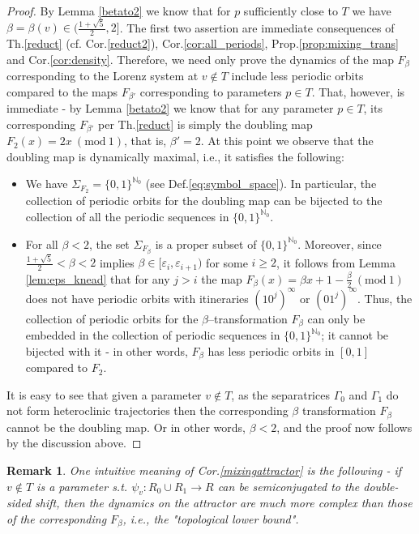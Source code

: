 \documentclass[10pt,reqno]{amsart}
\theoremstyle{plain}
\theoremstyle{assumption}
\theoremstyle{notation}
\theoremstyle{claim}
\theoremstyle{conj}
\newtheorem{remark}{\textbf{Remark}}[section]
\theoremstyle{theorem}
\theoremstyle{proposition}
\theoremstyle{corollary}
\newcommand{\Mod}[1]{\ (\mathrm{mod}\ #1)}
\begin{document}
\begin{proof}
    By Lemma \ref{betato2} we know that for $p$ sufficiently close to $T$ we have $\beta=\beta(v)\in(\frac{1+\sqrt{5}}{2},2]$. The first two assertion are immediate consequences of Th.\ref{reduct} (cf. Cor.\ref{reduct2}), Cor.\ref{cor:all_periods}, Prop.\ref{prop:mixing_trans} and Cor.\ref{cor:density}. Therefore, we need only prove the dynamics of the map $F_\beta$ corresponding to the Lorenz system at $v\notin T$ include less periodic orbits compared to the maps $F_{\beta'}$ corresponding to parameters $p\in T$. That, however, is immediate - by Lemma \ref{betato2} we know that for any parameter $p\in T$, its corresponding $F_{\beta'}$ per Th.\ref{reduct} is simply the doubling map $F_2(x)=2x\Mod{1}$, that is, $\beta'=2$. At this point we observe that the doubling map is dynamically maximal, i.e., it satisfies the following:
    \begin{itemize}
        \item We have $\Sigma_{F_2}=\{0,1\}^{\mathbb{N}_0}$ (see Def.\eqref{eq:symbol_space}). In particular, the collection of periodic orbits for the doubling map can be bijected to the collection of all the periodic sequences in $\{0,1\}^{\mathbb{N}_0}$.  
        \item For all $\beta<2$, the set $\Sigma_{F_{\beta}}$ is a proper subset of $\{0,1\}^{\mathbb{N}_0}$. Moreover, since $\frac{1+\sqrt{5}}{2}<\beta<2$ implies $\beta\in[\varepsilon_i,\varepsilon_{i+1})$ for some $i\geq2$, it follows from Lemma \ref{lem:eps_knead} that for any $j>i$ the map $F_\beta(x)=\beta x+1-\frac{\beta}{2}\Mod{1}  $ does not have periodic orbits with itineraries $(10^{j})^\infty$ or $(01^{j})^\infty$. Thus, the collection of periodic orbits for the $\beta$--transformation $F_\beta$ can only be embedded in the collection of periodic sequences in $\{0,1\}^{\mathbb{N}_0}$; it cannot be bijected with it - in other words, $F_\beta$ has less periodic orbits in $[0,1]$ compared to $F_2$.
    \end{itemize}
    
It is easy to see that given a parameter $v\not\in{T}$, as the separatrices $\Gamma_0$ and $\Gamma_1$ do not form heteroclinic trajectories then the corresponding $\beta$ transformation $F_\beta$ cannot be the doubling map. Or in other words, $\beta<2$, and the proof now follows by the discussion above.
\end{proof}
\begin{remark}
    One intuitive meaning of Cor.\ref{mixingattractor} is the following - if $v\not\in{T}$ is a parameter s.t. $\psi_v:R_0\cup R_1\to R$ can be semiconjugated to the double-sided shift, then the dynamics on the attractor are much more complex than those of the corresponding $F_\beta$, i.e., the "topological lower bound".
\end{remark}
\end{document}
